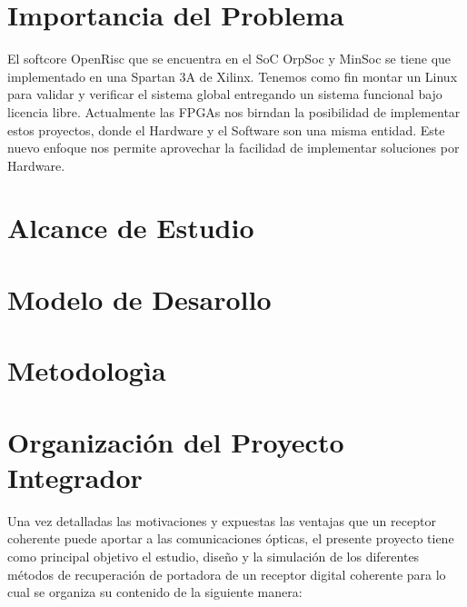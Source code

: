 \section{Importancia del Problema}

El softcore OpenRisc  que se encuentra en el SoC OrpSoc y MinSoc se tiene que implementado en una Spartan 3A de Xilinx. Tenemos como fin montar un Linux para validar y verificar el sistema global entregando un sistema funcional bajo licencia libre.
Actualmente las FPGAs nos birndan la posibilidad de implementar estos proyectos, donde el Hardware y el Software son una misma entidad. Este nuevo enfoque nos permite aprovechar la facilidad de implementar soluciones por Hardware.

\section{Alcance de Estudio}
\section{Modelo de Desarollo}
\section{Metodologìa}



 \section{Organización del Proyecto Integrador}

 Una vez detalladas  las motivaciones y expuestas las  ventajas que un
 receptor  coherente puede  aportar a  las comunicaciones  ópticas, el
 presente proyecto tiene como  principal objetivo el estudio, diseño y
 la simulación de los  diferentes métodos de recuperación de portadora
 de un receptor digital coherente para lo cual se organiza
 su contenido de la siguiente manera:\\



